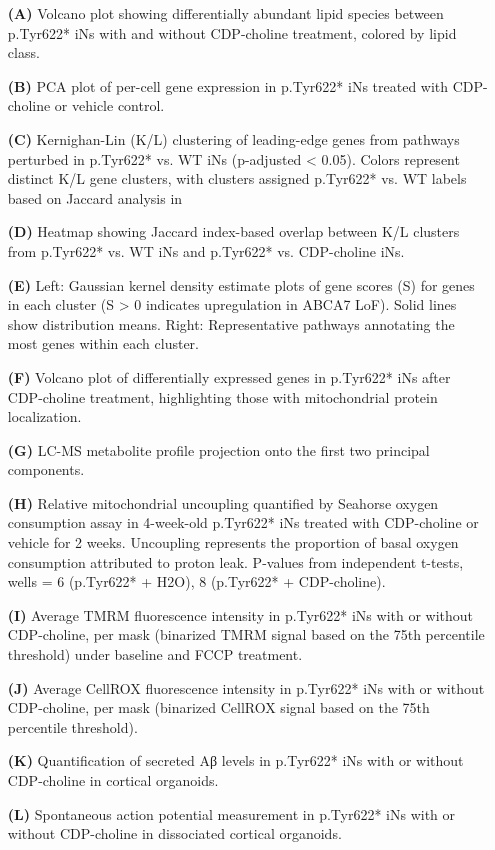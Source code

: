 \begin{itemize}
    \item[\textbf{(A)}] Volcano plot showing differentially abundant lipid species between p.Tyr622* iNs with and without CDP-choline treatment, colored by lipid class. 
    \item[\textbf{(B)}] PCA plot of per-cell gene expression in p.Tyr622* iNs treated with CDP-choline or vehicle control. 
    \item[\textbf{(C)}] Kernighan-Lin (K/L) clustering of leading-edge genes from pathways perturbed in p.Tyr622* vs. WT iNs (p-adjusted < 0.05). Colors represent distinct K/L gene clusters, with clusters assigned p.Tyr622* vs. WT labels based on Jaccard analysis in 
    \item[\textbf{(D)}] Heatmap showing Jaccard index-based overlap between K/L clusters from p.Tyr622* vs. WT iNs and p.Tyr622* vs. CDP-choline iNs. 
    \item[\textbf{(E)}] Left: Gaussian kernel density estimate plots of gene scores (S) for genes in each cluster (S > 0 indicates upregulation in ABCA7 LoF). Solid lines show distribution means. Right: Representative pathways annotating the most genes within each cluster. 
    \item[\textbf{(F)}] Volcano plot of differentially expressed genes in p.Tyr622* iNs after CDP-choline treatment, highlighting those with mitochondrial protein localization. 
    \item[\textbf{(G)}] LC-MS metabolite profile projection onto the first two principal components. 
    \item[\textbf{(H)}] Relative mitochondrial uncoupling quantified by Seahorse oxygen consumption assay in 4-week-old p.Tyr622* iNs treated with CDP-choline or vehicle for 2 weeks. Uncoupling represents the proportion of basal oxygen consumption attributed to proton leak. P-values from independent t-tests, wells = 6 (p.Tyr622* + H2O), 8 (p.Tyr622* + CDP-choline). 
    \item[\textbf{(I)}] Average TMRM fluorescence intensity in p.Tyr622* iNs with or without CDP-choline, per mask (binarized TMRM signal based on the 75th percentile threshold) under baseline and FCCP treatment. 
    \item[\textbf{(J)}] Average CellROX fluorescence intensity in p.Tyr622* iNs with or without CDP-choline, per mask (binarized CellROX signal based on the 75th percentile threshold). 
    \item[\textbf{(K)}] Quantification of secreted Aβ levels in p.Tyr622* iNs with or without CDP-choline in cortical organoids. 
    \item[\textbf{(L)}] Spontaneous action potential measurement in p.Tyr622* iNs with or without CDP-choline in dissociated cortical organoids.
\end{itemize}